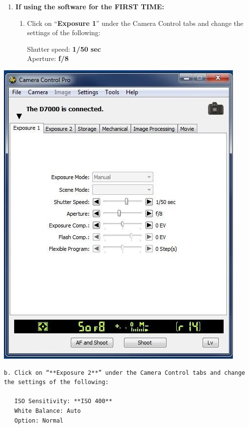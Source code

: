\documentclass[
]{book}
\begin{document}
\begin{enumerate}
\def\labelenumi{\arabic{enumi}.}
\setcounter{enumi}{4}
\item
  \textbf{If using the software for the FIRST TIME:}

  \begin{enumerate}
  \def\labelenumii{\alph{enumii}.}
  \item
    Click on ``\textbf{Exposure 1}'' under the Camera Control tabs and change the settings of the following:

    Shutter speed: \textbf{1/50 sec}\\
    Aperture: \textbf{f/8}
  \end{enumerate}
\end{enumerate}

\includegraphics{images/Camera3.jpg}

\begin{verbatim}
b. Click on “**Exposure 2**” under the Camera Control tabs and change the settings of the following:  

   ISO Sensitivity: **ISO 400**  
   White Balance: Auto  
   Option: Normal
\end{verbatim}
\end{document}
